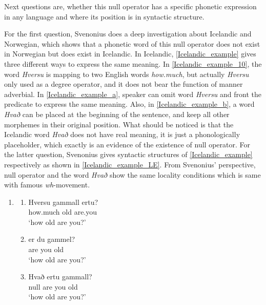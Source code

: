 \documentclass{ctexart}
\begin{document}
Next questions are, whether this null operator has a specific phonetic expression in any language and where its position is in syntactic structure. 

For the first question, Svenonius does a deep investigation about Icelandic and Norwegian, which shows that a phonetic word of this null operator does not exist in Norwegian but does exist in Icelandic. In Icelandic, \ref{Icelandic_example} gives three different ways to express the same meaning. In \ref{Icelandic_example_10}, the word \textit{Hversu} is mapping to two English words \textit{how.much}, but actually \textit{Hversu} only used as a degree operator, and it does not bear the function of manner adverbial. In \ref{Icelandic_example_a}, speaker can omit word \textit{Hversu} and front the predicate to express the same meaning. Also, in \ref{Icelandic_example_b}, a word \textit{Hvað} can be placed at the beginning of the sentence, and keep all other morphemes in their original position. What should be noticed is that the Icelandic word \textit{Hvað} does not have real meaning, it is just a phonologically placeholder, which exactly is an evidence of the existence of null operator. For the latter question, Svenonius gives syntactic structures of \ref{Icelandic_example} respectively as shown in \ref{Icelandic_example_LE}. From Svenonius' perspective, null operator and the word \textit{Hvað} show the same locality conditions which is same with famous \textit{wh}-movement. 

\begin{enumerate}
    \item \label{Icelandic_example}
    
    \begin{enumerate}
        \item \label{Icelandic_example_10}
        Hversu \enspace \enspace gammall \enspace ertu? \\
        how.much \enspace old \enspace \enspace \enspace are.you \\
        `how old are you?'

        \item \label{Icelandic_example_a}
        er \enspace du gammel? \\
        are you \enspace old \\
        `how old are you?'

        \item \label{Icelandic_example_b}
        Hvað ertu \enspace \enspace gammall? \\
        null \enspace are you \enspace old \\
        `how old are you?'

    \end{enumerate}   
    
\end{enumerate}
\end{document}
